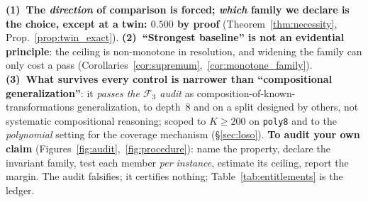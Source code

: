 \textbf{(1)~The \emph{direction} of comparison is forced; \emph{which} family we declare is the choice, except at a twin: $0.500$ by proof} (Theorem~\ref{thm:necessity}, Prop.~\ref{prop:twin_exact}). \textbf{(2)~``Strongest baseline'' is not an evidential principle}: the ceiling is non-monotone in resolution, and widening the family can only cost a pass (Corollaries~\ref{cor:supremum},~\ref{cor:monotone_family}). \textbf{(3)~What survives every control is narrower than ``compositional generalization''}: it \emph{passes the $\mathcal{F}_3$ audit} as composition-of-known-transformations generalization, to depth~8 and on a split designed by others, not systematic compositional reasoning; scoped to $K{\geq}200$ on \texttt{poly8} and to the \emph{polynomial} setting for the coverage mechanism (\S\ref{sec:loso}). \textbf{To audit your own claim} (Figures~\ref{fig:audit},~\ref{fig:procedure}): name the property, declare the invariant family, test each member \emph{per instance}, estimate its ceiling, report the margin. The audit falsifies; it certifies nothing; Table~\ref{tab:entitlements} is the ledger.
